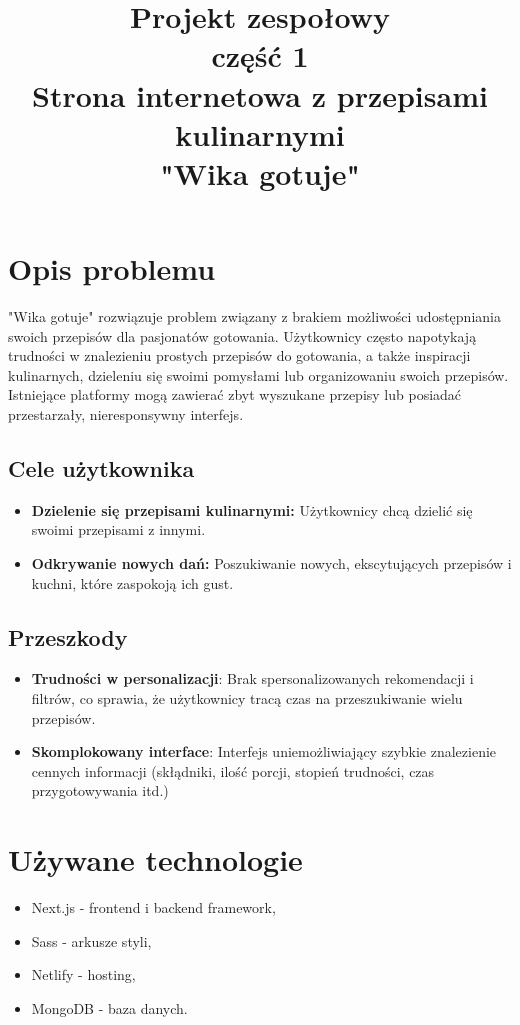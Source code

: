 \documentclass{article}
\title{\fontsize{20}{22}\selectfont Projekt zespołowy\\ część 1\\Strona internetowa z przepisami kulinarnymi\\"Wika gotuje"}
\date{}
\begin{document}
\maketitle
\newpage
\tableofcontents
\newpage

\section{Opis problemu}
\noindent
"Wika gotuje" rozwiązuje problem związany z brakiem możliwości udostępniania swoich przepisów dla pasjonatów gotowania. Użytkownicy często napotykają trudności w znalezieniu prostych przepisów do gotowania, a także inspiracji kulinarnych, dzieleniu się swoimi pomysłami lub organizowaniu swoich przepisów. 
\newline
Istniejące platformy mogą zawierać zbyt wyszukane przepisy lub posiadać przestarzały, nieresponsywny interfejs.

\subsection{Cele użytkownika}
\begin{itemize}
    \item \textbf{Dzielenie się przepisami kulinarnymi: }Użytkownicy chcą dzielić się swoimi przepisami z innymi.
    \item \textbf{Odkrywanie nowych dań: }Poszukiwanie nowych, ekscytujących przepisów i kuchni, które zaspokoją ich gust.
\end{itemize}

\subsection{Przeszkody}
\begin{itemize}
    \item \textbf{Trudności w personalizacji}: Brak spersonalizowanych rekomendacji i filtrów, co sprawia, że użytkownicy tracą czas na przeszukiwanie wielu przepisów.
    \item \textbf{Skomplokowany interface}: Interfejs uniemożliwiający szybkie znalezienie cennych informacji (skłądniki, ilość porcji, stopień trudności, czas przygotowywania itd.)
\end{itemize}


\section{Używane technologie}
\begin{itemize}
    \item Next.js - frontend i backend framework,
    \item Sass - arkusze styli,
    \item Netlify - hosting,
    \item MongoDB - baza danych.
\end{itemize}
\end{document}
